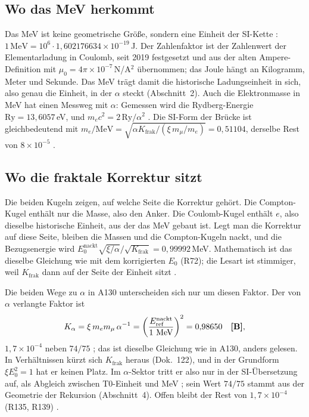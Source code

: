 \subsection{Wo das MeV herkommt}

Das MeV ist keine geometrische Größe, sondern eine Einheit der SI-Kette \QM:
$1\,\text{MeV}=10^6\cdot1{,}602176634\times10^{-19}$\,J. Der Zahlenfaktor ist der Zahlenwert der
Elementarladung in Coulomb, seit 2019 festgesetzt und aus der alten Ampere-Definition mit
$\mu_0=4\pi\times10^{-7}$\,N/A$^2$ übernommen; das Joule hängt an Kilogramm, Meter und Sekunde.
Das MeV trägt damit die historische Ladungseinheit in sich, also genau die Einheit, in der
$\alpha$ steckt (Abschnitt~2). Auch die Elektronmasse in MeV hat einen Messweg mit $\alpha$:
Gemessen wird die Rydberg-Energie $\mathrm{Ry}=13{,}6057$\,eV, und $m_ec^2=2\,\mathrm{Ry}/\alpha^2$
\BM. Die SI-Form der Brücke ist gleichbedeutend mit
$m_e/\text{MeV}=\sqrt{\alpha K_{\text{frak}}/(\xi\,m_\mu/m_e)}=0{,}51104$, derselbe Rest von
$8\times10^{-5}$ \KM.

\subsection{Wo die fraktale Korrektur sitzt}

Die beiden Kugeln zeigen, auf welche Seite die Korrektur gehört. Die Compton-Kugel enthält nur die
Masse, also den Anker. Die Coulomb-Kugel enthält $e$, also dieselbe historische Einheit, aus der
das MeV gebaut ist. Legt man die Korrektur auf diese Seite, bleiben die Massen und die
Compton-Kugeln nackt, und die Bezugsenergie wird $E_0^{\text{nackt}}\sqrt{\xi/\alpha}/\sqrt{K_{\text{frak}}}=0{,}99992$\,MeV.
Mathematisch ist das dieselbe Gleichung wie mit dem korrigierten $E_0$ (R72); die Lesart ist
stimmiger, weil $K_{\text{frak}}$ dann auf der Seite der Einheit sitzt \SM.

Die beiden Wege zu $\alpha$ in A130 unterscheiden sich nur um diesen Faktor. Der von $\alpha$
verlangte Faktor ist
\begin{equation}
  K_\alpha=\xi\,m_em_\mu\,\alpha^{-1}=\left(\frac{E_{\text{ref}}^{\text{nackt}}}{1\ \text{MeV}}\right)^2
  =0{,}98650\quad\BM ,
\end{equation}
$1{,}7\times10^{-4}$ neben $74/75$ \KM; das ist dieselbe Gleichung wie in A130, anders gelesen.
In Verhältnissen kürzt sich $K_{\text{frak}}$ heraus (Dok.~122), und in der Grundform
$\xi E_0^2=1$ hat er keinen Platz. Im $\alpha$-Sektor tritt er also nur in der SI-Übersetzung
auf, als Abgleich zwischen T0-Einheit und MeV \KM; sein Wert $74/75$ stammt aus der Geometrie der
Rekursion (Abschnitt~4). Offen bleibt der Rest von $1{,}7\times10^{-4}$ (R135, R139) \SM.

